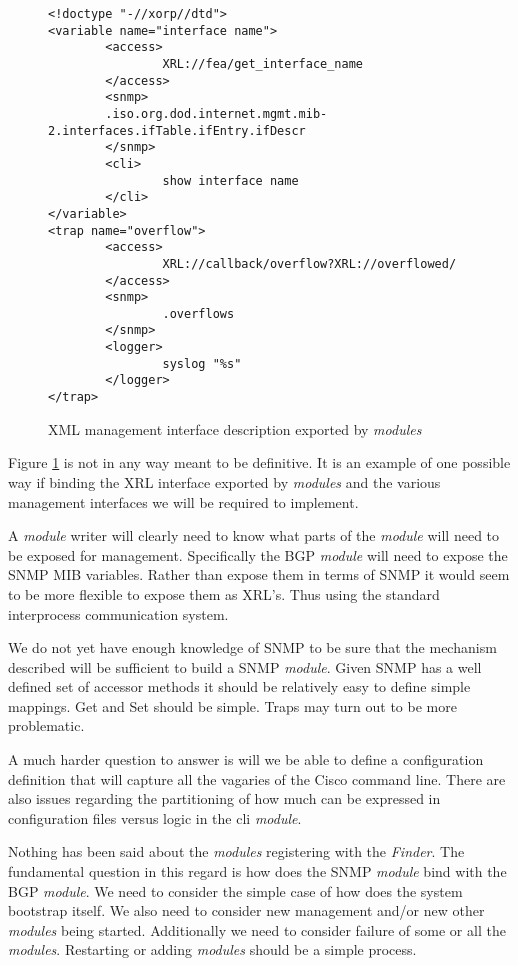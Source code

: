 \documentclass[11pt]{article}
\makeatletter
\newcommand{\module} {{\em module}\@\xspace}
\newcommand{\modules} {{\em modules}\@\xspace}
\newcommand{\finder} {{\em Finder}\@\xspace}
\makeatother
\begin{document}
\begin{figure}
\begin{verbatim}
<!doctype "-//xorp//dtd">
<variable name="interface name">
        <access>
                XRL://fea/get_interface_name
        </access>
        <snmp>
        .iso.org.dod.internet.mgmt.mib-2.interfaces.ifTable.ifEntry.ifDescr
        </snmp>
        <cli>
                show interface name
        </cli>
</variable>
<trap name="overflow">
        <access>
                XRL://callback/overflow?XRL://overflowed/
        </access>
        <snmp>
                .overflows
        </snmp>
        <logger>
                syslog "%s"
        </logger>
</trap>
\end{verbatim}
\caption{XML management interface description exported by \modules}
\label{xml}
\end{figure}

Figure \ref{xml} is not in any way meant to be definitive. It is an
example of one possible way if binding the XRL interface exported by
\modules and the various management interfaces we will be required to
implement. 

A \module writer will clearly need to know what parts of the \module
will need to be exposed for management. Specifically the BGP \module
will need to expose the SNMP MIB variables. Rather than expose them
in terms of SNMP it would seem to be more flexible to expose them as
XRL's. Thus using the standard interprocess communication system.

We do not yet have enough knowledge of SNMP to be sure that the
mechanism described will be sufficient to build a SNMP \module. Given
SNMP has a well defined set of accessor methods it should be
relatively easy to define simple mappings. Get and Set should be
simple. Traps may turn out to be more problematic.

A much harder question to answer is will we be able to define a
configuration definition that will capture all the vagaries of the
Cisco command line. There are also issues regarding the partitioning
of how much can be expressed in configuration files versus logic in
the cli \module.

Nothing has been said about the \modules registering with the \finder.
The fundamental question in this regard is how does the SNMP \module
bind with the BGP \module. We need to consider the simple case of how
does the system bootstrap itself. We also need to consider new
management and/or new other \modules being started. Additionally we
need to consider failure of some or all the \modules. Restarting or
adding \modules should be a simple process.
\end{document}
